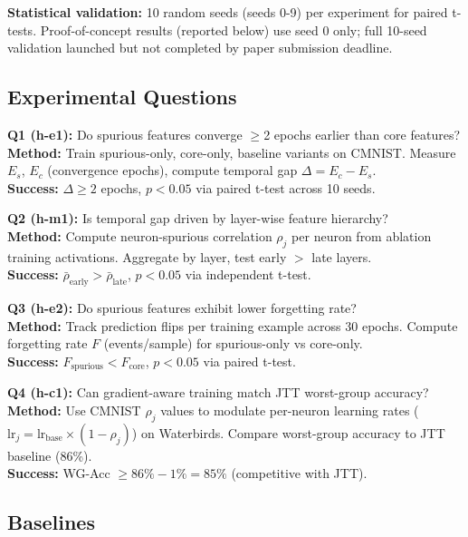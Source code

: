 \textbf{Statistical validation:} 10 random seeds (seeds 0-9) per experiment for paired t-tests. Proof-of-concept results (reported below) use seed 0 only; full 10-seed validation launched but not completed by paper submission deadline.

\subsection{Experimental Questions}

\textbf{Q1 (h-e1):} Do spurious features converge $\geq$2 epochs earlier than core features?\\
\textbf{Method:} Train spurious-only, core-only, baseline variants on CMNIST. Measure $E_s$, $E_c$ (convergence epochs), compute temporal gap $\Delta = E_c - E_s$.\\
\textbf{Success:} $\Delta \geq 2$ epochs, $p < 0.05$ via paired t-test across 10 seeds.

\textbf{Q2 (h-m1):} Is temporal gap driven by layer-wise feature hierarchy?\\
\textbf{Method:} Compute neuron-spurious correlation $\rho_j$ per neuron from ablation training activations. Aggregate by layer, test early $>$ late layers.\\
\textbf{Success:} $\bar{\rho}_{\text{early}} > \bar{\rho}_{\text{late}}$, $p < 0.05$ via independent t-test.

\textbf{Q3 (h-e2):} Do spurious features exhibit lower forgetting rate?\\
\textbf{Method:} Track prediction flips per training example across 30 epochs. Compute forgetting rate $F$ (events/sample) for spurious-only vs core-only.\\
\textbf{Success:} $F_{\text{spurious}} < F_{\text{core}}$, $p < 0.05$ via paired t-test.

\textbf{Q4 (h-c1):} Can gradient-aware training match JTT worst-group accuracy?\\
\textbf{Method:} Use CMNIST $\rho_j$ values to modulate per-neuron learning rates ($\text{lr}_j = \text{lr}_{\text{base}} \times (1 - \rho_j)$) on Waterbirds. Compare worst-group accuracy to JTT baseline (86\%).\\
\textbf{Success:} WG-Acc $\geq 86\% - 1\% = 85\%$ (competitive with JTT).

\subsection{Baselines}

